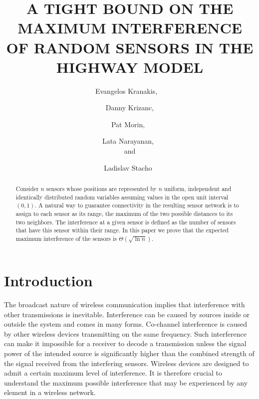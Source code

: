 \documentclass{patmorin}
\title{\MakeUppercase{A Tight Bound on the Maximum Interference \newline
       of Random Sensors in the Highway Model}}
\author{
Evangelos Kranakis,\footnotemark[1]~\footnotemark[6]~\footnotemark[5]
\and
Danny Krizanc,\footnotemark[2]
\and
Pat Morin,\footnotemark[1]~\footnotemark[5]
\and
Lata Narayanan,\footnotemark[3]~\footnotemark[5] \\ and
\and
Ladislav Stacho\footnotemark[4]~\footnotemark[5]
}
\begin{document}
\maketitle



\begin{abstract}
Consider $n$ sensors whose positions are 
represented by $n$ uniform, independent and identically
distributed random variables assuming values
in the open unit interval $(0,1)$. A natural way to guarantee connectivity
in the resulting sensor network is to assign to each sensor as its range, the maximum of the 
two possible distances to its two neighbors. 
The
interference at a given sensor
is defined as the number of sensors that have this sensor within their
range. In this paper we prove that 
the expected maximum interference
of the sensors is $\Theta (\sqrt{\ln n})$.
\end{abstract}


\section{Introduction}

The broadcast nature of wireless communication implies that interference with
other transmissions is inevitable. Interference can be caused by sources inside or outside the system and comes in many forms. Co-channel interference is caused by other wireless devices transmitting on the same frequency. Such 
interference can make it impossible for a receiver to decode a transmission
unless the signal power of the intended source is significantly higher than 
the combined strength of the signal received from the interfering sensors. Wireless 
devices are designed to admit a certain maximum level of interference. It is 
therefore crucial to understand the maximum possible interference that may be
experienced by any element in a 
wireless network. 
\end{document}
